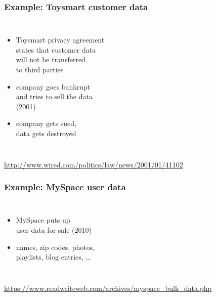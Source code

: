 \documentclass[dvipsnames]{beamer}
\theoremstyle{plain}
\begin{document}
\begin{frame}
  \frametitle{Example: Toysmart customer data}

  \begin{columns}

    \begin{itemize}
      \item Toysmart privacy agreement\\
        states that customer data\\
        will not be transferred\\
        to third parties
      \item company goes bankrupt\\
        and tries to sell the data\\
        (2001)
      \item company gets sued,\\
        data gets destroyed
    \end{itemize}
  \end{columns}

  \medskip
  \tiny{\url{http://www.wired.com/politics/law/news/2001/01/41102}}\\
\end{frame}

\begin{frame}
  \frametitle{Example: MySpace user data}

  \begin{columns}

    \begin{itemize}
      \item MySpace puts up\\
        user data for sale (2010)
      \item names, zip codes, photos,\\
        playlists, blog entries, \ldots
    \end{itemize}
  \end{columns}

  \medskip
  \tiny{\url{https://www.readwriteweb.com/archives/myspace_bulk_data.php}}\\
\end{frame}
\end{document}
